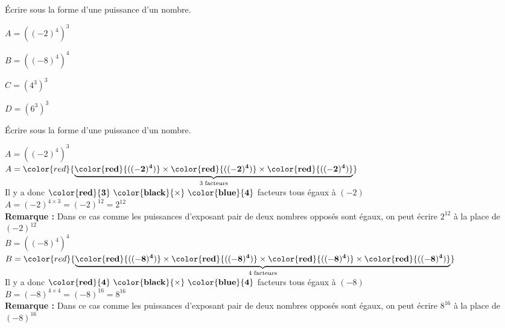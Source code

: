 \begin{exercice*}    
    Écrire sous la forme d'une puissance d'un nombre.
    \begin{multicols}{2}
        \begin{spacing}{2}
            $A=\left((-2)^4\right)^{3}$
            
            $B=\left((-8)^4\right)^{4}$

            \columnbreak            
            $C=\left(4^3\right)^{3}$

            $D=\left(6^3\right)^{3}$
        \end{spacing}
    \end{multicols}
\end{exercice*}
\begin{corrige}
    Écrire sous la forme d'une puissance d'un nombre.
        \begin{spacing}{2}
            $A=\left((-2)^4\right)^{3}$\\
            $A=\color{red}{\underbrace{\mathbf{\color{red}{((-2)^4)}} \times \mathbf{\color{red}{((-2)^4)}}\times \mathbf{\color{red}{((-2)^4)}}}_{3\thickspace\text{facteurs}}}$\\            
            Il y a donc $\mathbf{\color{red}{3}~\color{black}{\times}~\color{blue}{4}}$ facteurs tous égaux à $(-2)$\\
            $A=(-2)^{4\times3} = (-2)^{12}=  2^{12}$\\
            \textbf{Remarque : } Dans ce cas comme les puissances d'exposant pair de deux nombres opposés sont égaux, on peut écrire $ 2^{12}$ à la place de $(-2)^{12}$\\
            
            \medskip
            $B=\left((-8)^4\right)^{4}$\\
            $B=\color{red}{\underbrace{\mathbf{\color{red}{((-8)^4)}} \times \mathbf{\color{red}{((-8)^4)}}\times \mathbf{\color{red}{((-8)^4)}}\times \mathbf{\color{red}{((-8)^4)}}}_{4\thickspace\text{facteurs}}}$\\            
            Il y a donc $\mathbf{\color{red}{4}~\color{black}{\times}~\color{blue}{4}}$ facteurs tous égaux à $(-8)$\\
            $B=(-8)^{4\times4} = (-8)^{16}=  8^{16}$\\
            \textbf{Remarque : } Dans ce cas comme les puissances d'exposant pair de deux nombres opposés sont égaux, on peut écrire $ 8^{16}$ à la place de $(-8)^{16}$\\
            

\end{spacing}
\end{corrige}
